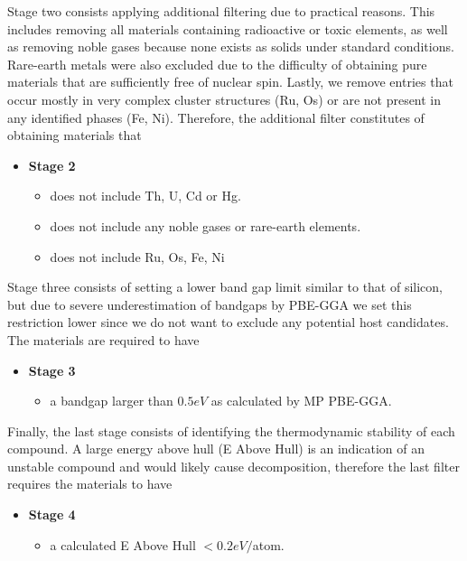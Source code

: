 Stage two consists applying additional filtering due to practical reasons. This includes removing all materials containing radioactive or toxic elements, as well as removing noble gases because none exists as solids under standard conditions. Rare-earth metals were also excluded due to the difficulty of obtaining pure materials that are sufficiently free of nuclear spin. Lastly, we remove entries that occur mostly in very complex cluster structures (Ru, Os) or are not present in any identified phases (Fe, Ni). Therefore, the additional filter constitutes of obtaining materials that
\begin{itemize}
  \item[]{\textbf{Stage 2}}
  \begin{itemize}
  \item does not include Th, U, Cd or Hg.
  \item does not include any noble gases or rare-earth elements.
  \item does not include Ru, Os, Fe, Ni
  \end{itemize}
\end{itemize}

\noindent Stage three consists of setting a lower band gap limit similar to that of silicon, but due to severe underestimation of bandgaps by PBE-GGA we set this restriction lower since we do not want to exclude any potential host candidates. The materials are required to have
\begin{itemize}
  \item[]{\textbf{Stage 3}}
  \begin{itemize}
  \item a bandgap larger than $0.5eV$ as calculated by MP PBE-GGA.
  \end{itemize}
\end{itemize}

\noindent Finally, the last stage consists of identifying the thermodynamic stability of each compound. A large energy above hull (E Above Hull) is an indication of an unstable compound and would likely cause decomposition, therefore the last filter requires the materials to have

\begin{itemize}
  \item[]{\textbf{Stage 4}}
  \begin{itemize}
  \item a calculated E Above Hull $<0.2eV/$atom.
  \end{itemize}
\end{itemize}

